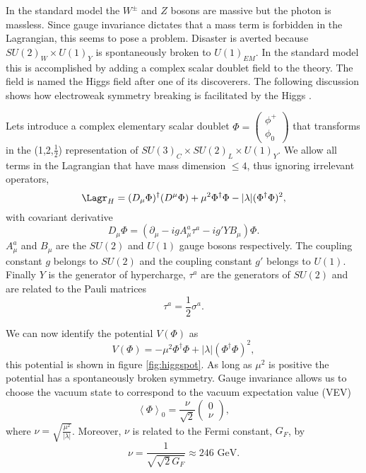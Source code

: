 
In the standard model the $W^{\pm}$ and $Z$ bosons are massive but the photon is massless.
Since gauge invariance dictates that a mass term is forbidden in the Lagrangian, this seems to pose a problem.
Disaster is averted because $SU(2)_W \times U(1)_Y$ is spontaneously broken to $U(1)_{EM}$.
In the standard model this is accomplished by adding a complex scalar doublet field to the theory.
The field is named the Higgs field after one of its discoverers.
The following discussion shows how electroweak symmetry breaking is facilitated by the Higgs \cite{ds 52, 53, peskin}.

Lets introduce a complex elementary scalar doublet $\Phi=\left(\begin{matrix}\phi^+\\\phi_0\end{matrix}\right)$ that transforms in the (1,2,$\frac{1}{2}$) representation of $SU(3)_C\times SU(2)_L\times U(1)_Y$.
We allow all terms in the Lagrangian that have mass dimension $\leq 4$, thus ignoring irrelevant operators,
\begin{equation}
  \Lagr_H=(D_\mu\Phi)^\dagger(D^\mu\Phi)+\mu^2\Phi^\dagger\Phi-|\lambda|(\Phi^\dagger\Phi)^2,
\end{equation}
with covariant derivative
\begin{equation}
  D_\mu\Phi=(\partial_\mu-igA^a_\mu\tau^a-ig'YB_\mu)\Phi.
\end{equation}
$A^a_\mu$ and $B_\mu$ are the $SU(2)$ and $U(1)$ gauge bosons respectively.
The coupling constant $g$ belongs to $SU(2)$ and the coupling constant $g'$ belongs to $U(1)$.
Finally $Y$ is the generator of hypercharge, $\tau^a$ are the generators of $SU(2)$ and are related to the Pauli matrices
\begin{equation}
  \tau^a=\frac{1}{2}\sigma^a.
\end{equation}

We can now identify the potential $V(\Phi)$ as
\begin{equation}
  V(\Phi)=-\mu^2\Phi^\dagger\Phi+|\lambda|(\Phi^\dagger\Phi)^2,
\end{equation}
this potential is shown in figure \ref{fig:higgspot}.
As long as $\mu^2$ is positive the potential has a spontaneously broken symmetry.
Gauge invariance allows us to choose the vacuum state to correspond to the vacuum expectation value (VEV)
\begin{equation}
  \left<\Phi\right>_0=\frac{\nu}{\sqrt{2}}\left(\begin{matrix}0 \\ \nu\end{matrix}\right),
\end{equation}
where $\nu=\sqrt{\frac{\mu^2}{|\lambda|}}$.
Moreover, $\nu$ is related to the Fermi constant, $G_F$, by
\begin{equation}
  \nu=\frac{1}{\sqrt{\sqrt{2}G_F}}\approx 246 \mbox{ GeV}.
\end{equation}

